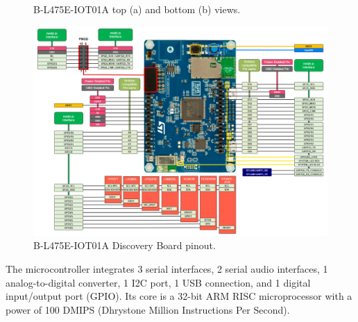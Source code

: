 \documentclass[10pt,a4paper,onecolumn]{article}
\begin{document}
\begin{figure}[H]
  \centering
  \hfill
  \caption{B-L475E-IOT01A top (a) and bottom (b) views.}
\end{figure}

\begin{figure}[H]
  \begin{center}
    \includegraphics[width=\dimexpr\textwidth-1cm\relax,height=\dimexpr0.25\textheight-1cm\relax,keepaspectratio]{images/board_pinout.png}
    \caption{B-L475E-IOT01A Discovery Board pinout.}
    \label{fig:B-L475E-IOT01A-Pinout}
  \end{center}
\end{figure}

The microcontroller integrates 3 serial interfaces, 2 serial audio interfaces, 1 analog-to-digital converter, 1 I2C port, 1 USB connection, and 1 digital input/output port (GPIO). Its core is a 32-bit ARM RISC microprocessor with a power of 100 DMIPS (Dhrystone Million Instructions Per Second).
\end{document}
